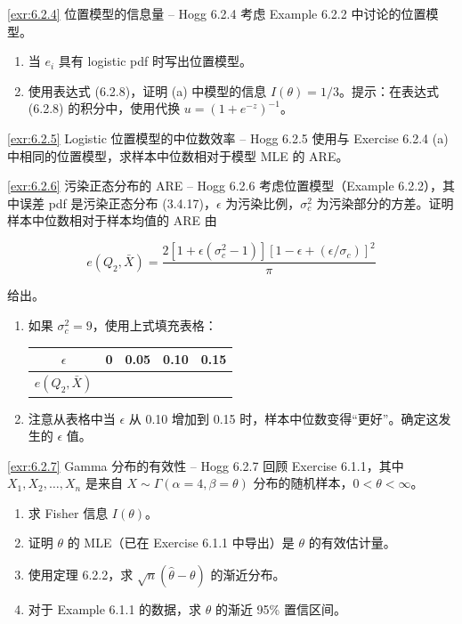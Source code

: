 \begin{exercise}{\ref{exr:6.2.4} 位置模型的信息量 – Hogg 6.2.4}\label{exr:6.2.4}
考虑 Example 6.2.2 中讨论的位置模型。

\begin{enumerate}
\item[(a)] 当 $e_i$ 具有 logistic pdf 时写出位置模型。
\item[(b)] 使用表达式 (6.2.8)，证明 (a) 中模型的信息 $I(\theta) = 1/3$。提示：在表达式 (6.2.8) 的积分中，使用代换 $u = (1+e^{-z})^{-1}$。
\end{enumerate}
\end{exercise}

\begin{exercise}{\ref{exr:6.2.5} Logistic 位置模型的中位数效率 – Hogg 6.2.5}\label{exr:6.2.5}
使用与 Exercise 6.2.4 (a) 中相同的位置模型，求样本中位数相对于模型 MLE 的 ARE。
\end{exercise}

\begin{exercise}{\ref{exr:6.2.6} 污染正态分布的 ARE – Hogg 6.2.6}\label{exr:6.2.6}
考虑位置模型（Example 6.2.2），其中误差 pdf 是污染正态分布 (3.4.17)，$\epsilon$ 为污染比例，$\sigma_c^2$ 为污染部分的方差。证明样本中位数相对于样本均值的 ARE 由

\[
e(Q_2, \bar{X}) = \frac{2[1+\epsilon(\sigma_c^2-1)][1-\epsilon+(\epsilon/\sigma_c)]^2}{\pi}
\]

给出。

\begin{enumerate}
\item[(a)] 如果 $\sigma_c^2 = 9$，使用上式填充表格：
\begin{center}
\begin{tabular}{c|cccc}
$\epsilon$ & 0 & 0.05 & 0.10 & 0.15 \\ \hline
$e(Q_2, \bar{X})$ & & & &
\end{tabular}
\end{center}
\item[(b)] 注意从表格中当 $\epsilon$ 从 0.10 增加到 0.15 时，样本中位数变得``更好''。确定这发生的 $\epsilon$ 值。
\end{enumerate}
\end{exercise}

\begin{exercise}{\ref{exr:6.2.7} Gamma 分布的有效性 – Hogg 6.2.7}\label{exr:6.2.7}
回顾 Exercise 6.1.1，其中 $X_1, X_2, \ldots, X_n$ 是来自 $X \sim \Gamma(\alpha=4, \beta=\theta)$ 分布的随机样本，$0 < \theta < \infty$。

\begin{enumerate}
\item[(a)] 求 Fisher 信息 $I(\theta)$。
\item[(b)] 证明 $\theta$ 的 MLE（已在 Exercise 6.1.1 中导出）是 $\theta$ 的有效估计量。
\item[(c)] 使用定理 6.2.2，求 $\sqrt{n}(\widehat{\theta}-\theta)$ 的渐近分布。
\item[(d)] 对于 Example 6.1.1 的数据，求 $\theta$ 的渐近 95\% 置信区间。
\end{enumerate}
\end{exercise}

